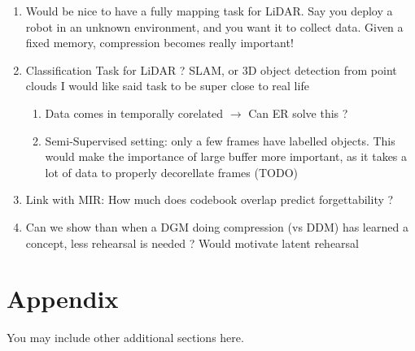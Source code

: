 \documentclass[colorinlistoftodos]{article} %
\begin{document}
\begin{enumerate}
    \item Would be nice to have a fully mapping task for LiDAR. Say you deploy a robot in an unknown environment, and you want it to collect data. Given a fixed memory, compression becomes really important!

    \item Classification Task for LiDAR ? SLAM, or 3D object detection from point clouds 
    I would like said task to be super close to real life
    \begin{enumerate}
        \item Data comes in temporally corelated $\rightarrow$ Can ER solve this ?
        \item Semi-Supervised setting: only a few frames have labelled objects. This would make the importance of large buffer more important, as it takes a lot of data to properly decorellate frames (TODO)
                
    \end{enumerate}
    
        
    \item Link with MIR: How much does codebook overlap predict forgettability ?
    
    \item Can we show than when a DGM doing compression (vs DDM) has learned a concept, less rehearsal is needed ? Would motivate latent rehearsal

\end{enumerate}






\appendix
\section{Appendix}
You may include other additional sections here. 
\end{document}
